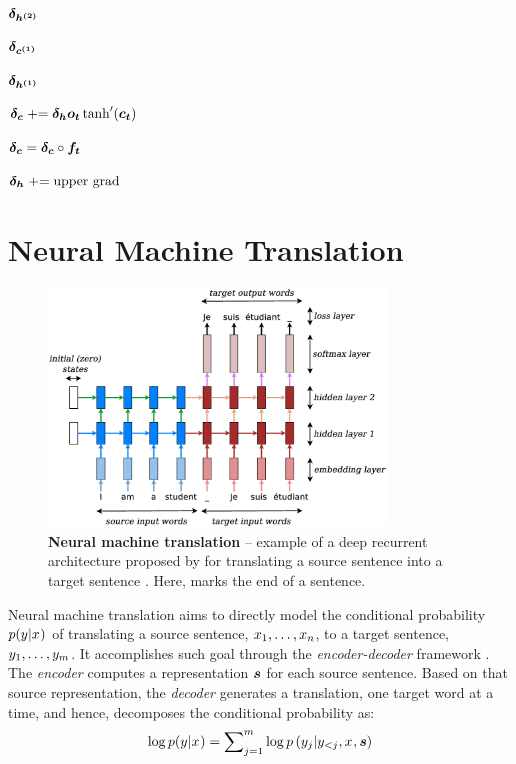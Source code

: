$\mbox{\boldmath{$\delta_{h^{(2)}}$}}$

$\mbox{\boldmath{$\delta_{c^{(1)}}$}}$

$\mbox{\boldmath{$\delta_{h^{(1)}}$}}$

$\mbox{\boldmath{$\delta_{c}$}} \mathrel{+}= \mbox{\boldmath{$\delta_{h}$}}\mbox{\boldmath{$o_t$}}\tanh'(\mbox{\boldmath{$c_t$}}) $

$\mbox{\boldmath{$\delta_{c}$}} = \mbox{\boldmath{$\delta_{c}$}} \circ \mbox{\boldmath{$f_t$}} $

$\mbox{\boldmath{$\delta_{h}$}} \mathrel{+}= \text{upper grad}$


\section{Neural Machine Translation}
\begin{figure}[tbh!]
\centering
\includegraphics[width=0.8\textwidth, clip=true, trim= 0 0 0
0]{img/nmt_very_details.eps} %
\caption[Neural machine translation]{{\bf Neural machine translation} -- example of a deep recurrent
architecture proposed by  for
translating a source sentence  into a target sentence
. Here, \word{\texttt{\_}} marks the end of a sentence.
} 
\label{f:nmt_details}
\end{figure}


Neural machine translation aims to directly model the conditional probability $p(y_{}|x_{})$ of translating
a source sentence, $x_{1},\ldots,x_{n}$, to a target sentence, $y_{1},\ldots,y_{m}$.
It accomplishes such goal through the {\it encoder-decoder} framework \cite{sutskever14,cho14}. The {\it encoder} computes a representation $\mbox{\boldmath{$s$}}$
for each source sentence. Based on that source representation,
the {\it decoder} generates a translation, one target word at a time, and hence, decomposes the conditional probability as:
\begin{equation}
\log p(y_{}|x_{}) = \sum_{j=1}^m \nolimits \log
p\left(y_{j}|y_{<j},x_{},\mbox{\boldmath{$s$}}\right)
\end{equation}

